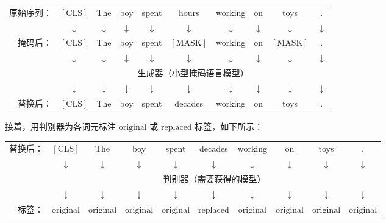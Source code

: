 \vspace{0.5em}
\begin{center}
\begingroup
\renewcommand{\arraystretch}{1.2}
\begin{tabular}{r c c c c c c c c c}
原始序列：& $[\mathrm{CLS}]$ & The & boy & spent & hours & working & on & toys & . \\
& $\downarrow$ & $\downarrow$ & $\downarrow$ & $\downarrow$ & $\downarrow$ & $\downarrow$ & $\downarrow$ & $\downarrow$ & $\downarrow$ \\
掩码后：& $[\mathrm{CLS}]$ & The & boy & spent & {\color{red} $[\mathrm{MASK}]$} & working & on & {\color{red} $[\mathrm{MASK}]$} & . \\
& $\downarrow$ & $\downarrow$ & $\downarrow$ & $\downarrow$ & {\color{red} $\downarrow$} & $\downarrow$ & $\downarrow$ & {\color{red} $\downarrow$} & $\downarrow$ \\ \cline{2-10}
& \multicolumn{9}{|c|}{生成器（小型掩码语言模型）} \\ \cline{2-10}
& $\downarrow$ & $\downarrow$ & $\downarrow$ & $\downarrow$ & {\color{red} $\downarrow$} & $\downarrow$ & $\downarrow$ & {\color{red} $\downarrow$} & $\downarrow$ \\
替换后：& $[\mathrm{CLS}]$ & The & boy & spent & {\color{red} decades} & working & on & {\color{red} toys} & .
\end{tabular}
\endgroup
\end{center}
\vspace{0.5em}

接着，用判别器为各词元标注 $\mathrm{original}$ 或 $\mathrm{replaced}$ 标签，如下所示：

\vspace{0.5em}
\begin{center}
\begingroup
\renewcommand{\arraystretch}{1.2}
\setlength{\tabcolsep}{3pt}
\begin{tabular}{r c c c c c c c c c}
替换后：& $[\mathrm{CLS}]$ & The & boy & spent & {\color{red} decades} & working & on & {\color{red} toys} & . \\
& $\downarrow$ & $\downarrow$ & $\downarrow$ & $\downarrow$ & {\color{red} $\downarrow$} & $\downarrow$ & $\downarrow$ & {\color{red} $\downarrow$} & $\downarrow$ \\ \cline{2-10}
& \multicolumn{9}{|c|}{判别器（需要获得的模型）} \\ \cline{2-10}
& $\downarrow$ & $\downarrow$ & $\downarrow$ & $\downarrow$ & {\color{red} $\downarrow$} & $\downarrow$ & $\downarrow$ & {\color{red} $\downarrow$} & $\downarrow$ \\
标签：& \footnotesize{$\mathrm{original}$} & \footnotesize{$\mathrm{original}$} & \footnotesize{$\mathrm{original}$} & \footnotesize{$\mathrm{original}$} & {\color{red} \footnotesize{$\mathrm{replaced}$}} & \footnotesize{$\mathrm{original}$} & \footnotesize{$\mathrm{original}$} & {\color{red} \footnotesize{$\mathrm{original}$}} & \footnotesize{$\mathrm{original}$}
\end{tabular}
\endgroup
\end{center}
\vspace{0.5em}

